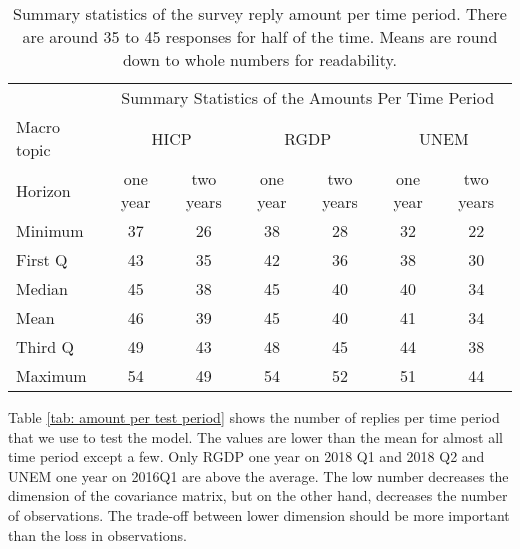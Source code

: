 \documentclass[11pt]{article}
\begin{document}
\begin{table}[!h]
	\centering
	\caption{Summary statistics of the survey reply amount per time period. There are around 35 to 45 responses for half of the time. Means are round down to whole numbers for readability.}
	\label{tab: time summary statistics}
	\begin{tabular}{lcccccc}%
		\hline
		&\multicolumn{6}{c}{Summary Statistics of the Amounts Per Time Period}\\
		\cmidrule(lr){2-7}
		Macro topic & \multicolumn{2}{c}{HICP} & \multicolumn{2}{c}{RGDP} & \multicolumn{2}{c}{UNEM} \\
		\cmidrule(lr){2-3} \cmidrule(lr){4-5}\cmidrule(lr){6-7}
		Horizon     & one year & two years & one year & two years & one year & two years \\ 
		\hline
		Minimum & 37    & 26    & 38    & 28    & 32    & 22    \\
		First Q & 43    & 35    & 42    & 36    & 38    & 30    \\
		Median  & 45    & 38    & 45    & 40    & 40    & 34    \\
		Mean    & 46    & 39    & 45    & 40    & 41    & 34    \\
		Third Q & 49    & 43    & 48    & 45    & 44    & 38    \\
		Maximum & 54    & 49    & 54    & 52    & 51    & 44       \\ 
		\hline
	\end{tabular}
\end{table}

Table \ref{tab: amount per test period} shows the number of replies per time period that we use to test the model. The values are lower than the mean for almost all time period except a few. Only RGDP one year on 2018 Q1 and 2018 Q2 and UNEM one year on 2016Q1 are above the average. The low number decreases the dimension of the covariance matrix, but on the other hand, decreases the number of observations. The trade-off between lower dimension should be more important than the loss in observations.
\end{document}
